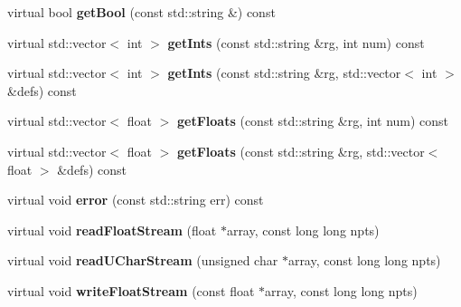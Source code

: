 \begin{DoxyCompactItemize}
virtual bool {\bfseries get\+Bool} (const std\+::string \&) const
\item 
\mbox{\label{class_s_e_p_1_1sep3d_file_a0a9a8c18963718b1eb6ddaf3fad49ef5}} 
virtual std\+::vector$<$ int $>$ {\bfseries get\+Ints} (const std\+::string \&rg, int num) const
\item 
\mbox{\label{class_s_e_p_1_1sep3d_file_afe7b23e218cbb7ec95f30cefcbae5414}} 
virtual std\+::vector$<$ int $>$ {\bfseries get\+Ints} (const std\+::string \&rg, std\+::vector$<$ int $>$ \&defs) const
\item 
\mbox{\label{class_s_e_p_1_1sep3d_file_a07ed234a4cf8a383f3f86954c6747d32}} 
virtual std\+::vector$<$ float $>$ {\bfseries get\+Floats} (const std\+::string \&rg, int num) const
\item 
\mbox{\label{class_s_e_p_1_1sep3d_file_ae22e0ceec5a184c042cc2c803a97dc15}} 
virtual std\+::vector$<$ float $>$ {\bfseries get\+Floats} (const std\+::string \&rg, std\+::vector$<$ float $>$ \&defs) const
\item 
\mbox{\label{class_s_e_p_1_1sep3d_file_a18e9223e14194d269e0b8ceabdf0949e}} 
virtual void {\bfseries error} (const std\+::string err) const
\item 
\mbox{\label{class_s_e_p_1_1sep3d_file_a7d931713aa1995cb26aefe6a3a309cef}} 
virtual void {\bfseries read\+Float\+Stream} (float $\ast$array, const long long npts)
\item 
\mbox{\label{class_s_e_p_1_1sep3d_file_ab647c63c57768884902640cb6c39d7e7}} 
virtual void {\bfseries read\+U\+Char\+Stream} (unsigned char $\ast$array, const long long npts)
\item 
\mbox{\label{class_s_e_p_1_1sep3d_file_a9550f654565b06836bd3560dbb7c3d24}} 
virtual void {\bfseries write\+Float\+Stream} (const float $\ast$array, const long long npts)
\item 
\mbox{\label{class_s_e_p_1_1sep3d_file_a340bcb4ab53faa01b9ae9feee3fad29c}} 

\end{DoxyCompactItemize}
